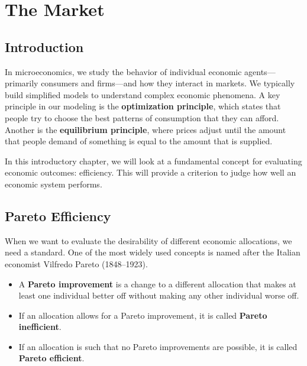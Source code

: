 \chapter{The Market}\label{chap:market}

\section{Introduction}

In microeconomics, we study the behavior of individual economic agents---primarily consumers and firms---and how they interact in markets. We typically build simplified models to understand complex economic phenomena. A key principle in our modeling is the \textbf{optimization principle}, which states that people try to choose the best patterns of consumption that they can afford. Another is the \textbf{equilibrium principle}, where prices adjust until the amount that people demand of something is equal to the amount that is supplied.

In this introductory chapter, we will look at a fundamental concept for evaluating economic outcomes: efficiency. This will provide a criterion to judge how well an economic system performs.

\section{Pareto Efficiency}\label{sec:pareto}

When we want to evaluate the desirability of different economic allocations, we need a standard. One of the most widely used concepts is named after the Italian economist Vilfredo Pareto (1848--1923).

\begin{definition}
\begin{itemize}
    \item A \textbf{Pareto improvement} is a change to a different allocation that makes at least one individual better off without making any other individual worse off.
    \item If an allocation allows for a Pareto improvement, it is called \textbf{Pareto inefficient}.
    \item If an allocation is such that no Pareto improvements are possible, it is called \textbf{Pareto efficient}.
\end{itemize}
\end{definition}

